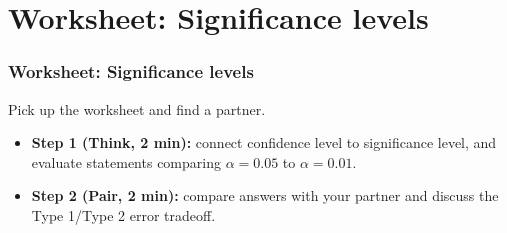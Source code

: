 \documentclass[t,compress,mathserif]{beamer}
\begin{document}

\section{Worksheet: Significance levels}

\begin{frame}
\frametitle{Worksheet: Significance levels}

Pick up the worksheet and find a partner.

\begin{itemize}
    \item \textbf{Step 1 (Think, 2 min):} connect confidence level to significance level, and evaluate statements comparing $\alpha=0.05$ to $\alpha=0.01$.
    \item \textbf{Step 2 (Pair, 2 min):} compare answers with your partner and discuss the Type 1/Type 2 error tradeoff.
\end{itemize}

\end{frame}











\end{document}
